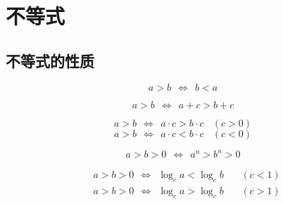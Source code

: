 \documentclass[UTF8]{ctexart}
\begin{document}
\newpage

\section{不等式}

\subsection{不等式的性质}

    \begin{large}
        \begin{equation*}
            a>b~~\Leftrightarrow~~b<a
        \end{equation*}
    \end{large}

    \begin{large}
        \begin{equation*}
            a>b~~\Leftrightarrow~~a+c>b+c
        \end{equation*}
    \end{large}

    \begin{large}
        \begin{equation*}
            a>b~~\Leftrightarrow~~a\cdot c>b\cdot c~~~~(c>0)
        \end{equation*}
        \begin{equation*}
            a>b~~\Leftrightarrow~~a\cdot c<b\cdot c~~~~(c<0)
        \end{equation*}
    \end{large}

    \begin{large}
        \begin{equation*}
            a>b>0~~\Leftrightarrow~~a^n>b^n>0
        \end{equation*}
    \end{large}

    \begin{large}
        \begin{align*}
            &a>b>0~~\Leftrightarrow~~\log_{c}a<\log_{c}b~~~~~~~~(c<1)\\[1mm]
            &a>b>0~~\Leftrightarrow~~\log_{c}a>\log_{c}b~~~~~~~~(c>1)
        \end{align*}
    \end{large}
\end{document}
